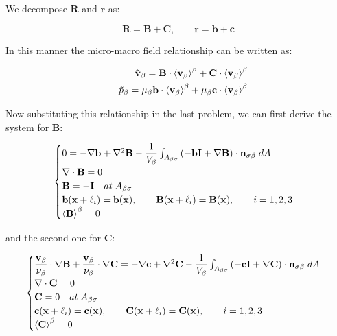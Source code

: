We decompose $\mathbf{R}$ and $\mathbf{r}$ as:

$$
 \mathbf{R} = \mathbf{B} + \mathbf{C}, \qquad \mathbf{r} = \mathbf{b} + \mathbf{c}
$$

In this manner the micro-macro field relationship can be written as:

\begin{eqnarray}
	&& \tilde{\textbf{v}}_{\beta} = \mathbf{B} \cdot {\left< \textbf{v}_{\beta}\right>}^{\beta} + \mathbf{C} \cdot {\left< \textbf{v}_{\beta}\right>}^{\beta}  \\
	&& \tilde{p}_{\beta} = \mu_{\beta} \mathbf{b} \cdot {\left< \textbf{v}_{\beta}\right>}^{\beta} + \mu_{\beta} \mathbf{c} \cdot {\left< \textbf{v}_{\beta}\right>}^{\beta}
	\label{eq:closure_viab_divison}
\end{eqnarray}

Now substituting this relationship in the last problem, we can first derive the system for $\mathbf{B}$:

\begin{eqnarray}
	\begin{cases}
		0 = -\nabla \mathbf{b} + \nabla^2 \mathbf{B} - \dfrac{1}{V_\beta} \int_{A_{\beta \sigma}}  \left(-\mathbf{b}\mathbf{I}  +  \nabla \mathbf{B} \right) \cdot \mathbf{n}_{\sigma \beta} \;dA  \\
		\nabla \cdot \mathbf{B} = 0  \\
		\mathbf{B} = -\mathbf{I} \quad at \; A_{\beta \sigma} \\
		\mathbf{b}(\mathbf{x} +\ell_i) = \mathbf{b}(\mathbf{x}), \qquad \mathbf{B}(\mathbf{x} +\ell_i) = \mathbf{B}(\mathbf{x}), \qquad i=1,2,3 \\
		{\left< \mathbf{B} \right>}^{\beta} = 0
	\end{cases}
\label{eq:B_problem}
\end{eqnarray}

and the second one for $\mathbf{C}$:

\begin{eqnarray}
	\begin{cases}
		\dfrac{\textbf{v}_{\beta}}{\nu_{\beta}} \cdot  \nabla \mathbf{B} +\dfrac{\textbf{v}_{\beta}}{\nu_{\beta}} \cdot  \nabla \mathbf{C} = -\nabla \mathbf{c} +  \nabla^2 \mathbf{C} - \dfrac{1}{V_\beta} \int_{A_{\beta \sigma}}  \left(-\mathbf{c}\mathbf{I}  +  \nabla \mathbf{C} \right) \cdot \mathbf{n}_{\sigma \beta} \;dA  \\
		\nabla \cdot \mathbf{C} = 0  \\
		\mathbf{C} = 0 \quad at \; A_{\beta \sigma} \\
		\mathbf{c}(\mathbf{x} +\ell_i) = \mathbf{c}(\mathbf{x}), \qquad \mathbf{C}(\mathbf{x} +\ell_i) = \mathbf{C}(\mathbf{x}), \qquad i=1,2,3 \\
		{\left< \mathbf{C} \right>}^{\beta} = 0
	\end{cases}
\label{eq:C_problem}
\end{eqnarray}

